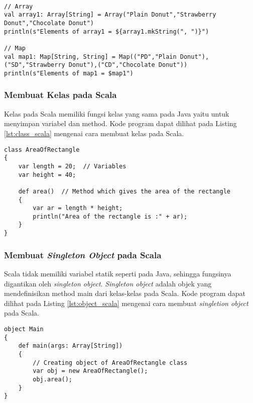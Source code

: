 \begin{lstlisting}[basicstyle=\ttfamily, frame=single,
	columns=fullflexible, keepspaces=true, breaklines=true, label=lst:mutable_collection, caption=Membuat mutable collection pada Scala]
	
// Array
val array1: Array[String] = Array("Plain Donut","Strawberry Donut","Chocolate Donut")
println(s"Elements of array1 = ${array1.mkString(", ")}")

// Map
val map1: Map[String, String] = Map(("PD","Plain Donut"),("SD","Strawberry Donut"),("CD","Chocolate Donut"))
println(s"Elements of map1 = $map1")

\end{lstlisting}

\subsubsection{Membuat Kelas pada Scala}
Kelas pada Scala memiliki fungsi kelas yang sama pada Java yaitu untuk menyimpan variabel dan method. Kode program dapat dilihat pada Listing \ref{lst:class_scala} mengenai cara membuat kelas pada Scala.

\begin{lstlisting}[basicstyle=\ttfamily, frame=single,
	columns=fullflexible, keepspaces=true, breaklines=true, label=lst:class_scala, caption=Membuat Kelas Object pada Scala]
class AreaOfRectangle 
{ 
    var length = 20;  // Variables 
    var height = 40; 
      
    def area()  // Method which gives the area of the rectangle 
    { 
        var ar = length * height; 
        println("Area of the rectangle is :" + ar); 
    } 
} 
\end{lstlisting}

\subsubsection{Membuat \textit{Singleton Object} pada Scala}
Scala tidak memiliki variabel statik seperti pada Java, sehingga fungsinya digantikan oleh {\it singleton object}. {\it Singleton object} adalah objek yang mendefinisikan method main dari kelas-kelas pada Scala. Kode program dapat dilihat pada Listing \ref{lst:object_scala} mengenai cara membuat \textit{singletion object} pada Scala.

\begin{lstlisting}[basicstyle=\ttfamily, frame=single,
	columns=fullflexible, keepspaces=true, breaklines=true, label=lst:object_scala, caption=Membuat Kelas Object pada Scala]
object Main 
{ 
    def main(args: Array[String])  
    { 
        // Creating object of AreaOfRectangle class 
        var obj = new AreaOfRectangle(); 
        obj.area(); 
    } 
} 
\end{lstlisting}

